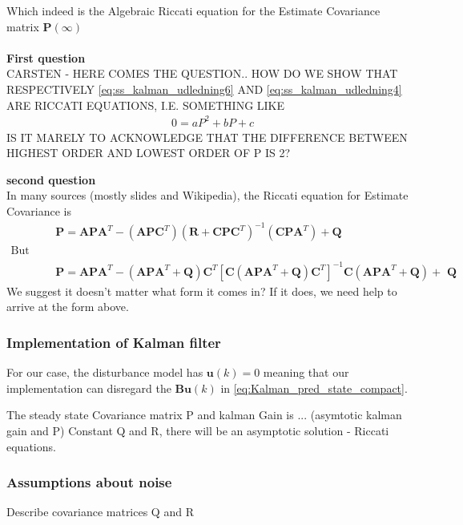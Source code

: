 Which indeed is the Algebraic Riccati equation for the Estimate Covariance matrix $\textbf{P}(\infty)$\\
\\

\textbf{First question}\\

CARSTEN - HERE COMES THE QUESTION.. HOW DO WE SHOW THAT RESPECTIVELY \cref{eq:ss_kalman_udledning6} AND \cref{eq:ss_kalman_udledning4} ARE RICCATI EQUATIONS, I.E. SOMETHING LIKE
\begin{align}
	&0 = aP^2 + bP + c 
\end{align}
IS IT MARELY TO ACKNOWLEDGE THAT THE DIFFERENCE BETWEEN HIGHEST ORDER AND LOWEST ORDER OF P IS 2?

\textbf{second question}\\
In many sources (mostly slides and Wikipedia), the Riccati equation for Estimate Covariance is 
\begin{align}
	&\textbf{P} = \textbf{APA}^T - (\textbf{APC}^T)(\textbf{R}+\textbf{CPC}^T)^{-1}(\textbf{CPA}^T)+\textbf{Q}  \\
	\text{But the closest we can get is } \\
	&\textbf{P} = \textbf{APA}^T - (\textbf{APA}^T+ \textbf{Q})\textbf{C}^T[\textbf{C}(\textbf{APA}^T+\textbf{Q})\textbf{C}^T]^{-1}\textbf{C}(\textbf{APA}^T + \textbf{Q}) + \textbf{ Q}
\end{align}
We suggest it doesn't matter what form it comes in? If it does, we need help to arrive at the form above.

\subsubsection{Implementation of Kalman filter}
For our case, the disturbance model has $ \textbf{u}(k)=0 $ meaning that our implementation can disregard the $ \textbf{B}\textbf{u}(k) $ in \cref{eq:Kalman_pred_state_compact}.


The steady state Covariance matrix P and kalman Gain is ... (asymtotic kalman gain and P)
Constant Q and R, there will be an asymptotic solution - Riccati equations. 

\subsubsection{Assumptions about noise}
Describe covariance matrices Q and R\\

